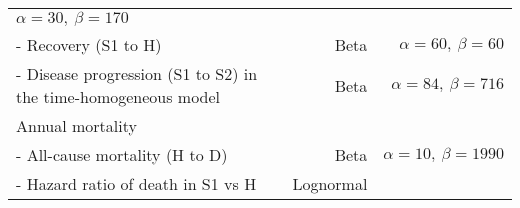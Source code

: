 \documentclass[
]{article}
\begin{document}
\begin{longtable}[]{@{}lrr@{}}
\begin{minipage}[t]{0.42\columnwidth}
\(\alpha=30, \ \beta=170\)\strut
\end{minipage}\tabularnewline
\begin{minipage}[t]{0.32\columnwidth}\raggedright
- Recovery (S1 to H)\strut
\end{minipage} & \begin{minipage}[t]{0.17\columnwidth}\raggedleft
Beta\strut
\end{minipage} & \begin{minipage}[t]{0.42\columnwidth}\raggedleft
\(\alpha=60, \ \beta=60\)\strut
\end{minipage}\tabularnewline
\begin{minipage}[t]{0.32\columnwidth}\raggedright
- Disease progression (S1 to S2) in the time-homogeneous model\strut
\end{minipage} & \begin{minipage}[t]{0.17\columnwidth}\raggedleft
Beta\strut
\end{minipage} & \begin{minipage}[t]{0.42\columnwidth}\raggedleft
\(\alpha=84, \ \beta=716\)\strut
\end{minipage}\tabularnewline
\begin{minipage}[t]{0.32\columnwidth}\raggedright
Annual mortality\strut
\end{minipage} & \begin{minipage}[t]{0.17\columnwidth}\raggedleft
\strut
\end{minipage} & \begin{minipage}[t]{0.42\columnwidth}\raggedleft
\strut
\end{minipage}\tabularnewline
\begin{minipage}[t]{0.32\columnwidth}\raggedright
- All-cause mortality (H to D)\strut
\end{minipage} & \begin{minipage}[t]{0.17\columnwidth}\raggedleft
Beta\strut
\end{minipage} & \begin{minipage}[t]{0.42\columnwidth}\raggedleft
\(\alpha=10, \ \beta=1990\)\strut
\end{minipage}\tabularnewline
\begin{minipage}[t]{0.32\columnwidth}\raggedright
- Hazard ratio of death in S1 vs H\strut
\end{minipage} & \begin{minipage}[t]{0.17\columnwidth}\raggedleft
Lognormal\strut
\end{minipage} & \begin{minipage}[t]{0.42\columnwidth}\raggedleft

\end{minipage}
\end{longtable}
\end{document}
